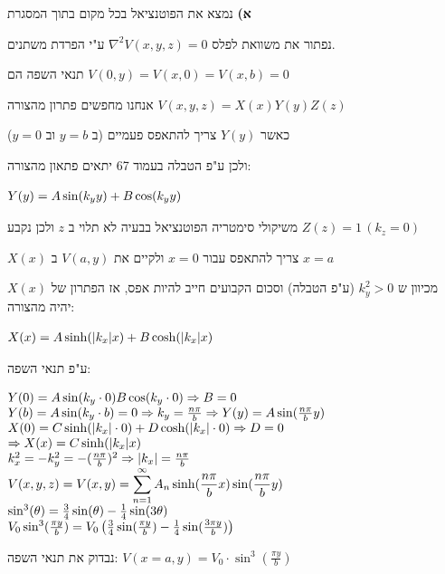 \documentclass[14pt]{extarticle}
\makeatletter
\newenvironment{lefteqs}{%
    \begin{english}%
    \begin{flushleft}%
    \renewcommand{\arraystretch}{1.3}%
    $\begin{array}{@{}l@{}}%
}{%
    \end{array}$%
    \end{flushleft}%
    \end{english}%
}
\makeatother
\begin{document}
\textbf{א)} 
נמצא את הפוטנציאל בכל מקום בתוך המסגרת

נפתור את משוואת לפלס $\nabla^2 V(x,y,z) = 0$ ע"י הפרדת משתנים.

תנאי השפה הם $V(0,y)=V(x,0)=V(x,b)=0$

אנחנו מחפשים פתרון מהצורה $V(x,y,z)=X(x)Y(y)Z(z)$

כאשר $Y(y)$ צריך להתאפס פעמיים (ב $y=b$ וב $y=0$)

ולכן ע"פ הטבלה בעמוד 67 יתאים פתאון מהצורה:

\begin{lefteqs}
    Y(y)=A\sin(k_y y) + B\cos(k_y y)
\end{lefteqs}

משיקולי סימטריה הפוטנציאל בבעיה לא תלוי ב $z$ ולכן נקבע $Z(z)=1 \, (k_z=0)$

$X(x)$ צריך להתאפס עבור $x=0$ ולקיים את $V(a,y)$ ב $x=a$

מכיוון ש $k_y^2>0$ (ע"פ הטבלה) וסכום הקבועים חייב להיות אפס, אז הפתרון של $X(x)$ יהיה מהצורה:

\begin{lefteqs}
    X(x)=A\sinh(|k_x| x) + B\cosh(|k_x| x)
\end{lefteqs}

ע"פ תנאי השפה:

\begin{lefteqs}
    Y(0) = A\sin(k_y \cdot 0) B \cos(k_y \cdot 0) \Rightarrow B = 0 \\
    Y(b) = A\sin(k_y \cdot b) = 0 \Rightarrow k_y = \frac{n\pi}{b} \Rightarrow Y(y)=A\sin(\frac{n\pi}{b}y) \\
    X(0) = C \sinh(|k_x| \cdot 0) + D\cosh(|k_x| \cdot 0) \Rightarrow  D=0 \\
    \Rightarrow X(x) = C\sinh(|k_x|x) \\
    k_x^2 = -k_y^2 = -(\frac{n\pi}{b})^2 \Rightarrow |k_x| = \frac{n\pi}{b} \\
    V(x,y,z) = V(x,y) = \displaystyle \sum_{n=1}^{\infty} A_n \sinh(\frac{n\pi}{b}x)\sin(\frac{n\pi}{b}y) \\
    \sin^3(\theta)=\frac{3}{4}\sin(\theta) - \frac{1}{4}\sin(3\theta) \\
    V_0\sin^3(\frac{\pi y}{b}) = V_0\left( \frac{3}{4}\sin(\frac{\pi y}{b}) - \frac{1}{4}\sin(\frac{3\pi y}{b}) \right) \\
\end{lefteqs}

נבדוק את תנאי השפה: $V(x=a,y) = V_0 \cdot \sin^3(\frac{\pi y}{b})$
\end{document}

